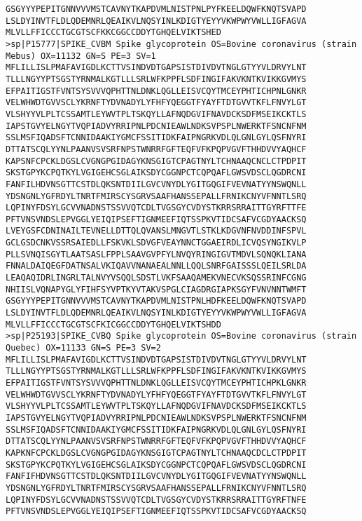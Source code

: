 \documentclass[en,black,12pt,normal]{elegantnote}
\begin{document}
\begin{lstlisting}
GSGYYYPEPITGNNVVVMSTCAVNYTKAPDVMLNISTPNLPYFKEELDQWFKNQTSVAPD
LSLDYINVTFLDLQDEMNRLQEAIKVLNQSYINLKDIGTYEYYVKWPWYVWLLIGFAGVA
MLVLLFFICCCTGCGTSCFKKCGGCCDDYTGHQELVIKTSHED
>sp|P15777|SPIKE_CVBM Spike glycoprotein OS=Bovine coronavirus (strain Mebus) OX=11132 GN=S PE=3 SV=1
MFLILLISLPMAFAVIGDLKCTTVSINDVDTGAPSISTDIVDVTNGLGTYYVLDRVYLNT
TLLLNGYYPTSGSTYRNMALKGTLLLSRLWFKPPFLSDFINGIFAKVKNTKVIKKGVMYS
EFPAITIGSTFVNTSYSVVVQPHTTNLDNKLQGLLEISVCQYTMCEYPHTICHPNLGNKR
VELWHWDTGVVSCLYKRNFTYDVNADYLYFHFYQEGGTFYAYFTDTGVVTKFLFNVYLGT
VLSHYYVLPLTCSSAMTLEYWVTPLTSKQYLLAFNQDGVIFNAVDCKSDFMSEIKCKTLS
IAPSTGVYELNGYTVQPIADVYRRIPNLPDCNIEAWLNDKSVPSPLNWERKTFSNCNFNM
SSLMSFIQADSFTCNNIDAAKIYGMCFSSITIDKFAIPNGRKVDLQLGNLGYLQSFNYRI
DTTATSCQLYYNLPAANVSVSRFNPSTWNRRFGFTEQFVFKPQPVGVFTHHDVVYAQHCF
KAPSNFCPCKLDGSLCVGNGPGIDAGYKNSGIGTCPAGTNYLTCHNAAQCNCLCTPDPIT
SKSTGPYKCPQTKYLVGIGEHCSGLAIKSDYCGGNPCTCQPQAFLGWSVDSCLQGDRCNI
FANFILHDVNSGTTCSTDLQKSNTDIILGVCVNYDLYGITGQGIFVEVNATYYNSWQNLL
YDSNGNLYGFRDYLTNRTFMIRSCYSGRVSAAFHANSSEPALLFRNIKCNYVFNNTLSRQ
LQPINYFDSYLGCVVNADNSTSSVVQTCDLTVGSGYCVDYSTKRRSRRAITTGYRFTTFE
PFTVNSVNDSLEPVGGLYEIQIPSEFTIGNMEEFIQTSSPKVTIDCSAFVCGDYAACKSQ
LVEYGSFCDNINAILTEVNELLDTTQLQVANSLMNGVTLSTKLKDGVNFNVDDINFSPVL
GCLGSDCNKVSSRSAIEDLLFSKVKLSDVGFVEAYNNCTGGAEIRDLICVQSYNGIKVLP
PLLSVNQISGYTLAATSASLFPPLSAAVGVPFYLNVQYRINGIGVTMDVLSQNQKLIANA
FNNALDAIQEGFDATNSALVKIQAVVNANAEALNNLLQQLSNRFGAISSSLQEILSRLDA
LEAQAQIDRLINGRLTALNVYVSQQLSDSTLVKFSAAQAMEKVNECVKSQSSRINFCGNG
NHIISLVQNAPYGLYFIHFSYVPTKYVTAKVSPGLCIAGDRGIAPKSGYFVNVNNTWMFT
GSGYYYPEPITGNNVVVMSTCAVNYTKAPDVMLNISTPNLHDFKEELDQWFKNQTSVAPD
LSLDYINVTFLDLQDEMNRLQEAIKVLNQSYINLKDIGTYEYYVKWPWYVWLLIGFAGVA
MLVLLFFICCCTGCGTSCFKICGGCCDDYTGHQELVIKTSHDD
>sp|P25193|SPIKE_CVBQ Spike glycoprotein OS=Bovine coronavirus (strain Quebec) OX=11133 GN=S PE=3 SV=2
MFLILLISLPMAFAVIGDLKCTTVSINDVDTGAPSISTDIVDVTNGLGTYYVLDRVYLNT
TLLLNGYYPTSGSTYRNMALKGTLLLSRLWFKPPFLSDFINGIFAKVKNTKVIKKGVMYS
EFPAITIGSTFVNTSYSVVVQPHTTNLDNKLQGLLEISVCQYTMCEYPHTICHPKLGNKR
VELWHWDTGVVSCLYKRNFTYDVNADYLYFHFYQEGGTFYAYFTDTGVVTKFLFNVYLGT
VLSHYYVLPLTCSSAMTLEYWVTPLTSKQYLLAFNQDGVIFNAVDCKSDFMSEIKCKTLS
IAPSTGVYELNGYTVQPIADVYRRIPNLPDCNIEAWLNDKSVPSPLNWERKTFSNCNFNM
SSLMSFIQADSFTCNNIDAAKIYGMCFSSITIDKFAIPNGRKVDLQLGNLGYLQSFNYRI
DTTATSCQLYYNLPAANVSVSRFNPSTWNRRFGFTEQFVFKPQPVGVFTHHDVVYAQHCF
KAPKNFCPCKLDGSLCVGNGPGIDAGYKNSGIGTCPAGTNYLTCHNAAQCDCLCTPDPIT
SKSTGPYKCPQTKYLVGIGEHCSGLAIKSDYCGGNPCTCQPQAFLGWSVDSCLQGDRCNI
FANFIFHDVNSGTTCSTDLQKSNTDIILGVCVNYDLYGITGQGIFVEVNATYYNSWQNLL
YDSNGNLYGFRDYLTNRTFMIRSCYSGRVSAAFHANSSEPALLFRNIKCNYVFNNTLSRQ
LQPINYFDSYLGCVVNADNSTSSVVQTCDLTVGSGYCVDYSTKRRSRRAITTGYRFTNFE
PFTVNSVNDSLEPVGGLYEIQIPSEFTIGNMEEFIQTSSPKVTIDCSAFVCGDYAACKSQ

\end{lstlisting}
\end{document}

